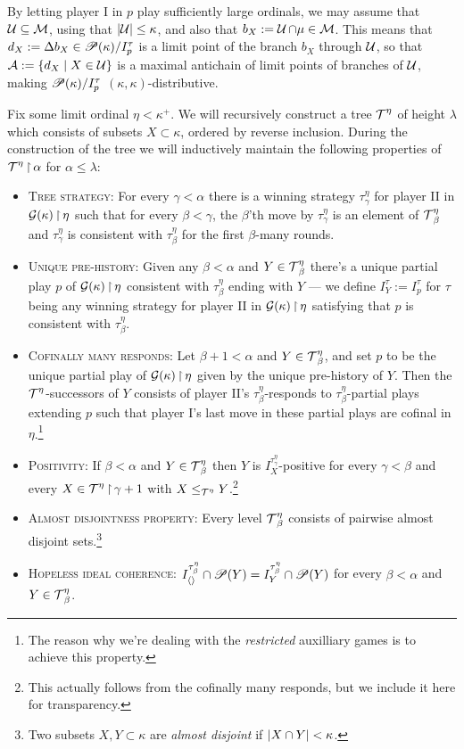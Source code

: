 \documentclass[../../main]{subfiles}
\begin{document}
{{		\qquad By letting player I in $p$ play sufficiently large ordinals, we may assume that $\operatorname{\mathcal U}\subseteq\operatorname{\mathcal M}$, using that $\left|\operatorname{\mathcal U}\right|\leq\kappa$, and also that $b_X:=\operatorname{\mathcal U}\cap\mu\in\operatorname{\mathcal M}$. This means that $d_X:=\Delta b_X\in\mathscr P(\kappa)/I_p^\tau$ is a limit point of the branch $b_X$ through $\operatorname{\mathcal U}$, so that $\mathcal A:=\{d_X\mid X\in\operatorname{\mathcal U}\}$ is a maximal antichain of limit points of branches of $\operatorname{\mathcal U}$, making $\mathscr P(\kappa)/I_p^\tau$ $(\kappa,\kappa)$-distributive.
	}

	Fix some limit ordinal $\eta<\kappa^+$. We will recursively construct a tree $\operatorname{\mathcal T}^\eta$ of height $\lambda$ which consists of subsets $X\subset\kappa$, ordered by reverse inclusion. During the construction of the tree we will inductively maintain the following properties of $\operatorname{\mathcal T}^\eta\operatorname{\upharpoonright}\alpha$ for $\alpha\leq\lambda$:\\

	\begin{itemize}
		\item \textsc{Tree strategy}: For every $\gamma<\alpha$ there is a winning strategy $\tau^\eta_\gamma$ for player II in $\operatorname{\mathcal G}(\kappa)\operatorname{\upharpoonright}\eta$ such that for every $\beta<\gamma$, the $\beta$'th move by $\tau^\eta_\gamma$ is an element of $\operatorname{\mathcal T}^\eta_\beta$ and $\tau^\eta_\gamma$ is consistent with $\tau^\eta_\beta$ for the first $\beta$-many rounds.
		\item \textsc{Unique pre-history}: Given any $\beta<\alpha$ and $Y\in\operatorname{\mathcal T}^\eta_\beta$ there's a unique partial play $p$ of $\operatorname{\mathcal G}(\kappa)\operatorname{\upharpoonright}\eta$ consistent with $\tau^\eta_\beta$ ending with $Y$ --- we define $I_Y^\tau:=I_p^\tau$ for $\tau$ being any winning strategy for player II in $\operatorname{\mathcal G}(\kappa)\operatorname{\upharpoonright}\eta$ satisfying that $p$ is consistent with $\tau^\eta_\beta$.
		\item \textsc{Cofinally many responds}: Let $\beta+1<\alpha$ and $Y\in\operatorname{\mathcal T}^\eta_\beta$, and set $p$ to be the unique partial play of $\operatorname{\mathcal G}(\kappa)\operatorname{\upharpoonright}\eta$ given by the unique pre-history of $Y$. Then the $\operatorname{\mathcal T}^\eta$-successors of $Y$ consists of player II's $\tau^\eta_\beta$-responds to $\tau^\eta_\beta$-partial plays extending $p$ such that player I's last move in these partial plays are cofinal in $\eta$.\footnote{The reason why we're dealing with the \textit{restricted} auxilliary games is to achieve this property.}
		\item \textsc{Positivity}: If $\beta<\alpha$ and $Y\in\operatorname{\mathcal T}^\eta_\beta$ then $Y$ is $I_X^{\tau^\eta_\gamma}$-positive for every $\gamma<\beta$ and every $X\in\operatorname{\mathcal T}^\eta\operatorname{\upharpoonright}\gamma+1$ with $X\leq_{\operatorname{\mathcal T}^\eta}Y$.\footnote{This actually follows from the cofinally many responds, but we include it here for transparency.}
	\item \textsc{Almost disjointness property}: Every level $\operatorname{\mathcal T}^\eta_\beta$ consists of pairwise almost disjoint sets.\footnote{Two subsets $X,Y\subset\kappa$ are \textit{almost disjoint} if $\left|X\cap Y\right|<\kappa$.}
		\item \textsc{Hopeless ideal coherence}: $I_{\langle \rangle}^{\tau^\eta_\beta}\cap\mathscr P(Y)=I_Y^{\tau^\eta_\beta}\cap\mathscr P(Y)$ for every $\beta<\alpha$ and $Y\in\operatorname{\mathcal T}^\eta_\beta$.\\
	\end{itemize}

}
\end{document}
